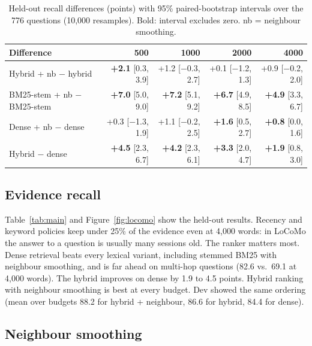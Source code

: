 \documentclass[11pt]{article}
\begin{document}
\begin{table}[t]
  \centering
  \small
  \begin{tabular}{lrrrr}
    \toprule
    Difference & 500 & 1000 & 2000 & 4000 \\
    \midrule
    Hybrid + nb $-$ hybrid   & \textbf{+2.1} {\scriptsize[0.3, 3.9]} & +1.2 {\scriptsize[$-$0.3, 2.7]} & +0.1 {\scriptsize[$-$1.2, 1.3]} & +0.9 {\scriptsize[$-$0.2, 2.0]} \\
    BM25-stem + nb $-$ BM25-stem & \textbf{+7.0} {\scriptsize[5.0, 9.0]} & \textbf{+7.2} {\scriptsize[5.1, 9.2]} & \textbf{+6.7} {\scriptsize[4.9, 8.5]} & \textbf{+4.9} {\scriptsize[3.3, 6.7]} \\
    Dense + nb $-$ dense     & +0.3 {\scriptsize[$-$1.3, 1.9]} & +1.1 {\scriptsize[$-$0.2, 2.5]} & \textbf{+1.6} {\scriptsize[0.5, 2.7]} & \textbf{+0.8} {\scriptsize[0.0, 1.6]} \\
    Hybrid $-$ dense         & \textbf{+4.5} {\scriptsize[2.3, 6.7]} & \textbf{+4.2} {\scriptsize[2.3, 6.1]} & \textbf{+3.3} {\scriptsize[2.0, 4.7]} & \textbf{+1.9} {\scriptsize[0.8, 3.0]} \\
    \bottomrule
  \end{tabular}
  \caption{Held-out recall differences (points) with 95\% paired-bootstrap intervals over the
  776 questions (10,000 resamples). Bold: interval excludes zero. nb = neighbour smoothing.}
  \label{tab:boot}
\end{table}

\subsection{Evidence recall}

Table~\ref{tab:main} and Figure~\ref{fig:locomo} show the held-out results. Recency and
keyword policies keep under 25\% of the evidence even at 4,000 words: in LoCoMo the answer to a
question is usually many sessions old. The ranker matters most. Dense retrieval beats every
lexical variant, including stemmed BM25 with neighbour smoothing, and is far ahead on multi-hop
questions (82.6 vs.\ 69.1 at 4,000 words). The hybrid improves on dense by 1.9 to 4.5 points.
Hybrid ranking with neighbour smoothing is best at every budget. Dev showed the same ordering
(mean over budgets 88.2 for hybrid + neighbour, 86.6 for hybrid, 84.4 for dense).

\subsection{Neighbour smoothing}
\end{document}

